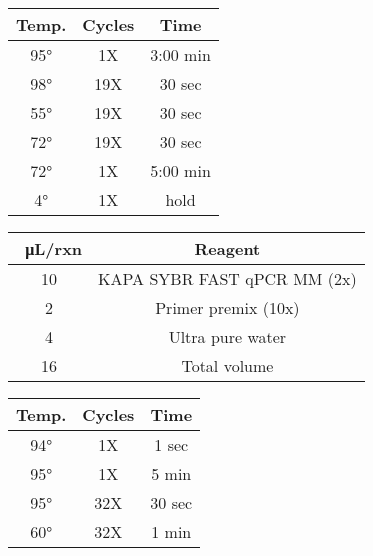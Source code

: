 \documentclass{article}
\begin{document}
\vspace{5mm}
\begin{minipage}[c]{\linewidth}
\centering
\begin{tabular}{ |c|c|c| }
\hline
Temp. & Cycles & Time\\
\hline
95\si{\degree} & 1X & 3:00 min \\
98\si{\degree} & 19X & 30 sec \\
55\si{\degree} & 19X & 30 sec \\
72\si{\degree} & 19X & 30 sec \\
72\si{\degree} & 1X & 5:00 min \\
4\si{\degree} & 1X & hold \\
 \hline
\end{tabular}
\label{table_pcr_flow}
\end{minipage}

\vspace{5mm}
\begin{minipage}[c]{\linewidth}
\centering
\begin{tabular}{ |c|c| }
\hline
\SI{}{\micro\liter}/rxn & Reagent\\
\hline
 10 & KAPA SYBR FAST qPCR MM (2x)\\ 
 2 & Primer premix (10x) \\ 
 4 & Ultra pure water\\
 16 & Total volume\\
 \hline
\end{tabular}
\label{table_qpcr_reagents}
\end{minipage}

\vspace{5mm}
\begin{minipage}[c]{\linewidth}
\centering
\begin{tabular}{ |c|c|c| }
\hline
Temp. & Cycles & Time\\
\hline
94\si{\degree} & 1X & 1 sec \\
95\si{\degree} & 1X & 5 min \\
95\si{\degree} & 32X & 30 sec \\
60\si{\degree} & 32X & 1 min \\
 \hline
\end{tabular}
\label{table_qpcr_recipe}
\end{minipage}
\printbibliography
\end{document}
